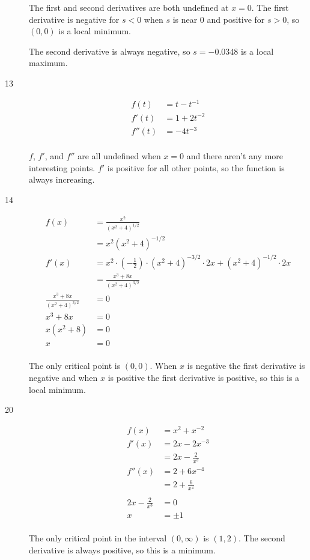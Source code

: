 \documentclass[fleqn]{exam}
\begin{document}
\begin{description}
The first and second derivatives are both undefined at $x = 0$.  The first derivative is negative for $s < 0$ when $s$ is
near 0 and positive for $s > 0$, so $(0, 0)$ is a local minimum. 

The second derivative is always negative, so $s = -0.0348$ is a local maximum.

\item[13]
\begin{align*}
  f(t)   &= t - t^{-1} \\
  f'(t)  &= 1 + 2t^{-2} \\
  f''(t) &= -4t^{-3} \\
\end{align*}

$f$, $f'$, and $f''$ are all undefined when $x = 0$ and there aren't any more interesting points.  $f'$ is positive for
all other points, so the function is always increasing.

\item[14]
\begin{align*}
  f(x)   &= \frac{x^2}{(x^2 + 4)^{1/2}} \\
         &= x^2 (x^2 + 4)^{-1/2} \\
  f'(x)  &= x^2 \cdot \left(-\frac{1}{2} \right) \cdot (x^2 + 4)^{-3/2} \cdot 2x + (x^2 + 4)^{-1/2} \cdot 2x \\
         &= \frac{x^3 + 8x}{(x^2 + 4)^{3/2}} \\
  \frac{x^3 + 8x}{(x^2 + 4)^{3/2}} &= 0 \\
  x^3 + 8x &= 0 \\
  x(x^2 + 8) &= 0 \\
  x &= 0 \\
\end{align*}

The only critical point is $(0, 0)$.  When $x$ is negative the first derivative is negative and when $x$ is positive the
first derivative is positive, so this is a local minimum.

\item[20]
\begin{align*}
  f(x)   &= x^2 + x^{-2} \\
  f'(x)  &= 2x - 2x^{-3} \\
         &= 2x - \frac{2}{x^3} \\
  f''(x) &= 2 + 6x^{-4} \\
         &= 2 + \frac{6}{x^4} \\
\\
  2x - \frac{2}{x^3} &= 0 \\
  x &= \pm 1 \\
\end{align*}

The only critical point in the interval $(0, \infty)$ is $(1, 2)$.  The second derivative is always positive, so this is a minimum.


\end{description}
\end{document}
